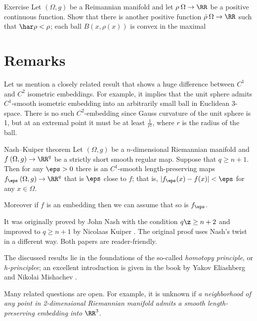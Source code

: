 \begin{thm}{Exercise}
Let $(\Omega,g)$ be a Reimannian manifold and let $\rho\:\Omega\to\RR$ be a positive continuous function.
Show that there is another positive function $\hat\rho\:\Omega\to\RR$ such that $\har\rho<\rho$; each ball $B(x,\rho(x))$ is convex in the maximal
\end{thm}









\section{Remarks}

Let us mention a closely related result that shows a huge difference between $C^1$ and $C^2$ isometric embeddings.
For example, it implies that the unit sphere admits $C^1$-smooth isometric embedding into an arbitrarily small ball in Euclidean 3-space.
There is no such $C^2$-embedding since Gauss curvature of the unit sphere is 1, but at an extremal point it must be at least $\tfrac1{r^2}$, where $r$ is the radius of the ball.

\begin{thm}{Nash--Kuiper theorem}
Let $(\Omega ,g)$ be a $n$-dimensional Riemannian manifold and $f\:(\Omega ,g)\to \RR^q$ be a strictly short smooth regular map.
Suppose that $q\ge n+1$.
Then for any $\eps>0$ there is an $C^1$-smooth length-preserving maps $f_\eps\:(\Omega ,g)\to \RR^q$ that is $\eps$ close to $f$;
that is, $|f_\eps(x)-f(x)|<\eps$ for any $x\in \Omega$.

Moreover if $f$ is an embedding then we can assume that so is $f_\eps$.

\end{thm}


It was originally proved by John Nash \cite{nash-1954} with the condition $q\z\ge n+2$ and improved to $q\ge n+1$ by Nicolaas Kuiper \cite{kuiper-1955}.
The original proof uses Nash's twist in a different way.
Both papers are reader-friendly.

The discussed results lie in the foundations of the so-called \emph{homotopy principle}, or \emph{h-principlee}; an excellent introduction is given in the book by Yakov Eliashberg and Nikolai Mishachev \cite{eliashberg-mishachev}.

Many related questions are open.
For example, it is unknown if \textit{a neighborhood of any point in 2-dimensional Riemannian manifold admits a smooth length-preserving embedding into $\RR^3$}.








